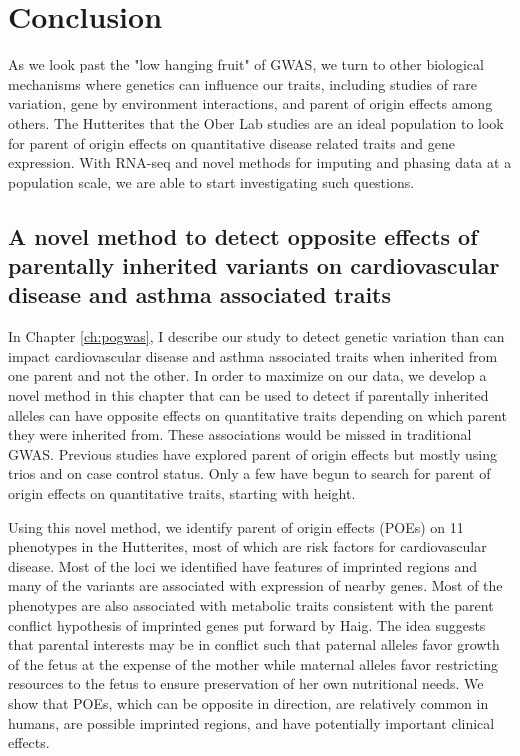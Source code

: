 \chapter{Conclusion}

As we look past the "low hanging fruit" of GWAS, we turn to other biological mechanisms where genetics can influence our traits, including studies of rare variation\cite{Igartua:2017ir}, gene by environment interactions, and parent of origin effects among others. The Hutterites that the Ober Lab studies are an ideal population to look for parent of origin effects on quantitative disease related traits and gene expression\cite{Weiss:2005cq,Abney2001,Ober:2001dy}. With RNA-seq and novel methods for imputing and phasing data at a population scale\citep{Livne2015}, we are able to start investigating such questions. 


\section{A novel method to detect opposite effects of parentally inherited variants on cardiovascular disease and asthma associated traits}
 
 In Chapter \ref{ch:pogwas}, I describe our study to detect genetic variation than can impact cardiovascular disease and asthma associated traits when inherited from one parent and not the other. In order to maximize on our data, we develop a novel method in this chapter that can be used to detect if parentally inherited alleles can have opposite effects on quantitative traits depending on which parent they were inherited from. These associations would be missed in traditional GWAS. Previous studies have explored parent of origin effects but mostly using trios\cite{Garg2012a,Ainsworth:2010bp,Howey:2012hj} and on case control status\cite{Kong:2009kk,Ainsworth:2010bp}. Only a few have begun to search for parent of origin effects on quantitative traits, starting with height\cite{Benonisdottir:2016dz,Zoledziewska:2015do}.
 
Using this novel method, we identify parent of origin effects (POEs) on 11 phenotypes in the Hutterites, most of which are risk factors for cardiovascular disease. Most of the loci we identified have features of imprinted regions and many of the variants are associated with expression of nearby genes. Most of the phenotypes are also associated with metabolic traits consistent with the parent conflict hypothesis of imprinted genes put forward by Haig\citep{Haig:2000if,Barlow:2014dv,Patten:2016cb}. The idea suggests that parental interests may be in conflict such that paternal alleles favor growth of the fetus at the expense of the mother while maternal alleles favor restricting resources to the fetus to ensure preservation of her own nutritional needs. We show that POEs, which can be opposite in direction, are relatively common in humans, are possible imprinted regions, and have potentially important clinical effects. 
 
